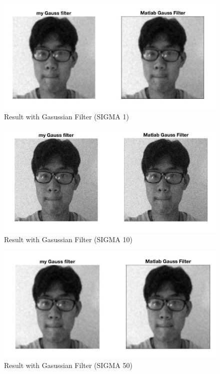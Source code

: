 \documentclass{article}
\begin{document}
\begin{figure}[htbp]
    \centering
    \includegraphics[scale = 0.3]{fig24.jpg}
    \caption{Result with Gasussian Filter (SIGMA 1)}
    \label{fig24}
\end{figure}
\begin{figure}[htbp]
    \centering
    \includegraphics[scale = 0.3]{fig25.jpg}
    \caption{Result with Gasussian Filter (SIGMA 10)}
    \label{fig25}
\end{figure}
\begin{figure}[htbp]
    \centering
    \includegraphics[scale = 0.3]{fig26.jpg}
    \caption{Result with Gasussian Filter (SIGMA 50)}
    \label{fig26}
\end{figure}
\end{document}
